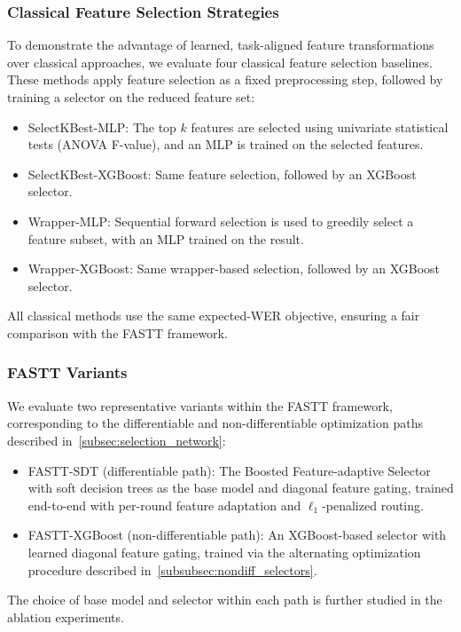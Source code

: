 \documentclass[journal]{IEEEtran}
\begin{document}
    \subsubsection{Classical Feature Selection Strategies}
    To demonstrate the advantage of learned, task-aligned feature transformations
    over classical approaches, we evaluate four classical feature selection
    baselines. These methods apply feature selection as a fixed preprocessing step,
    followed by training a selector on the reduced feature set:
    \begin{itemize}
        \item SelectKBest-MLP: The top $k$ features are selected using
            univariate statistical tests (ANOVA F-value), and an MLP is trained on
            the selected features.

        \item SelectKBest-XGBoost: Same feature selection, followed by an XGBoost
            selector.

        \item Wrapper-MLP: Sequential forward selection is used to greedily
            select a feature subset, with an MLP trained on the result.

        \item Wrapper-XGBoost: Same wrapper-based selection, followed by an XGBoost
            selector.
    \end{itemize}
    All classical methods use the same expected-WER objective, ensuring a fair
    comparison with the FASTT framework.

    \subsubsection{FASTT Variants}
    We evaluate two representative variants within the FASTT framework, corresponding
    to the differentiable and non-differentiable optimization paths described in~\cref{subsec:selection_network}:
    \begin{itemize}
        \item FASTT-SDT (differentiable path): The Boosted Feature-adaptive
            Selector with soft decision trees as the base model and diagonal
            feature gating, trained end-to-end with per-round feature adaptation
            and $\ell_{1}$-penalized routing.

        \item FASTT-XGBoost (non-differentiable path): An XGBoost-based selector
            with learned diagonal feature gating, trained via the alternating optimization
            procedure described in~\cref{subsubsec:nondiff_selectors}.
    \end{itemize}
    The choice of base model and selector within each path is further studied in
    the ablation experiments.
\end{document}
